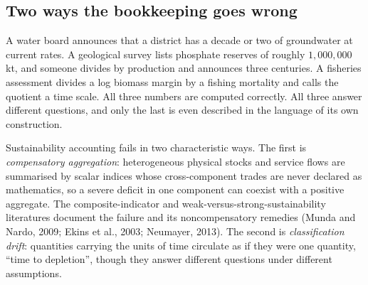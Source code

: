 \noindent{}

\subsection{Two ways the bookkeeping goes wrong}\label{sec:twoways}
A water board announces that a district has a decade or two of groundwater at
current rates. A geological survey lists phosphate reserves of roughly
$1{,}000{,}000$\,kt, and someone divides by production and announces three
centuries. A fisheries assessment divides a log biomass margin by a fishing
mortality and calls the quotient a time scale. All three numbers are computed
correctly. All three answer different questions, and only the last is even
described in the language of its own construction.

Sustainability accounting fails in two characteristic ways. The first is
\emph{compensatory aggregation}: heterogeneous physical stocks and service
flows are summarised by scalar indices whose cross-component trades are never
declared as mathematics, so a severe deficit in one component can coexist with
a positive aggregate. The composite-indicator and
weak-versus-strong-sustainability literatures document the failure and its
noncompensatory remedies (Munda and Nardo, 2009; Ekins et al., 2003; Neumayer,
2013). The second is \emph{classification drift}: quantities carrying the units
of time circulate as if they were one quantity, ``time to depletion'', though
they answer different questions under different assumptions.

